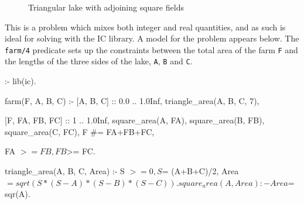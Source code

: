\begin{figure}
\begin{center}
\end{center}
\caption{Triangular lake with adjoining square fields}
\label{lake-fields}
\end{figure}

This is a problem which mixes both integer and real quantities, and as such
is ideal for solving with the IC library.  A model for the problem appears
below.  The \texttt{farm/4} predicate sets up the constraints between the
total area of the farm \texttt{F} and the lengths of the three sides of the
lake, \texttt{A}, \texttt{B} and \texttt{C}.

\begin{code}
:- lib(ic).

farm(F, A, B, C) :-
        [A, B, C] :: 0.0 .. 1.0Inf,     %
        triangle_area(A, B, C, 7),      %

        [F, FA, FB, FC] :: 1 .. 1.0Inf, %
        square_area(A, FA),
        square_area(B, FB),
        square_area(C, FC),
        F #= FA+FB+FC,

        FA $>= FB, FB $>= FC.           %

triangle_area(A, B, C, Area) :-
        S $>= 0,
        S $= (A+B+C)/2,
        Area $= sqrt(S*(S-A)*(S-B)*(S-C)).

square_area(A, Area) :-
        Area $= sqr(A).
\end{code}


